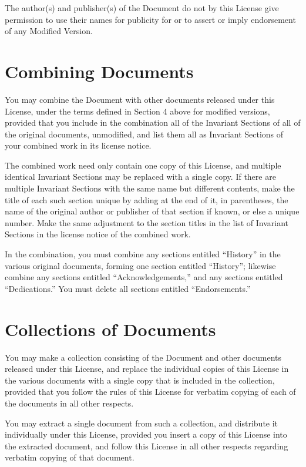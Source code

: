 The author(s) and publisher(s) of the Document do not by this License
give permission to use their names for publicity for or to assert
or imply endorsement of any Modified Version.

\section{Combining Documents}

You may combine the Document with other documents released under this
License, under the terms defined in Section 4 above for modified versions,
provided that you include in the combination all of the Invariant
Sections of all of the original documents, unmodified, and list them
all as Invariant Sections of your combined work in its license notice.

The combined work need only contain one copy of this License, and
multiple identical Invariant Sections may be replaced with a single
copy. If there are multiple Invariant Sections with the same name
but different contents, make the title of each such section unique
by adding at the end of it, in parentheses, the name of the original
author or publisher of that section if known, or else a unique number.
Make the same adjustment to the section titles in the list of Invariant
Sections in the license notice of the combined work.

In the combination, you must combine any sections entitled ``History''
in the various original documents, forming one section entitled ``History'';
likewise combine any sections entitled ``Acknowledgements,'' and
any sections entitled ``Dedications.'' You must delete all sections
entitled ``Endorsements.''

\section{Collections of Documents}

You may make a collection consisting of the Document and other documents
released under this License, and replace the individual copies of
this License in the various documents with a single copy that is included
in the collection, provided that you follow the rules of this License
for verbatim copying of each of the documents in all other respects.

You may extract a single document from such a collection, and distribute
it individually under this License, provided you insert a copy of
this License into the extracted document, and follow this License
in all other respects regarding verbatim copying of that document.

